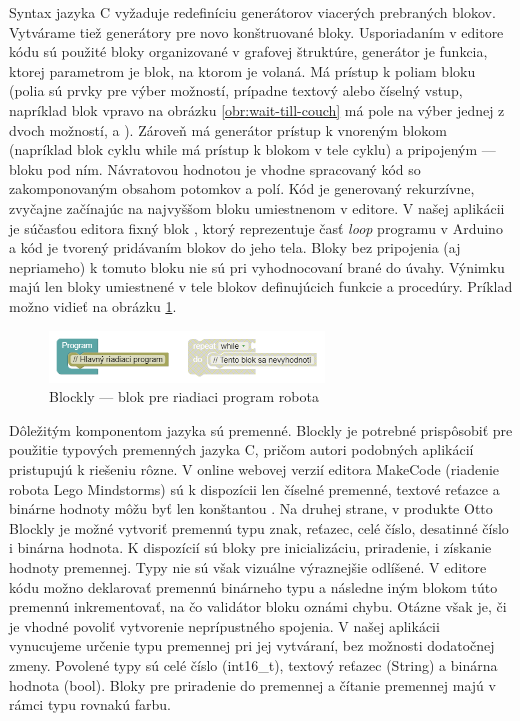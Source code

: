 Syntax jazyka C vyžaduje redefiníciu generátorov viacerých prebraných blokov. Vytvárame tiež generátory pre novo konštruované bloky. Usporiadaním v editore kódu sú použité bloky organizované v grafovej štruktúre, generátor je funkcia, ktorej parametrom je blok, na ktorom je volaná. Má prístup k poliam bloku (polia sú prvky pre výber možností, prípadne textový alebo číselný vstup, napríklad blok vpravo na obrázku \ref{obr:wait-till-couch} má pole na výber jednej z dvoch možností,  a ). Zároveň má generátor prístup k vnoreným blokom (napríklad blok cyklu while má prístup k blokom v tele cyklu) a pripojeným  --- bloku pod ním. Návratovou hodnotou je vhodne spracovaný kód so zakomponovaným obsahom potomkov a polí. Kód je generovaný rekurzívne, zvyčajne začínajúc na najvyššom bloku umiestnenom v editore. V našej aplikácii je súčasťou editora fixný blok , ktorý reprezentuje časť \textit{loop} programu v Arduino a kód je tvorený pridávaním blokov do jeho tela. Bloky bez pripojenia (aj nepriameho) k tomuto bloku nie sú pri vyhodnocovaní brané do úvahy. Výnimku majú len bloky umiestnené v tele blokov definujúcich funkcie a procedúry. Príklad možno vidieť na obrázku \ref{obr:disabled-orphan-block}.

\begin{figure}
\centerline{\includegraphics[width=0.65\textwidth]{images/disabled-orphan-block}}
\caption[Blockly --- blok pre riadiaci program robota]{Blockly --- blok pre riadiaci program robota}
\label{obr:disabled-orphan-block}
\end{figure}

Dôležitým komponentom jazyka sú premenné. Blockly je potrebné prispôsobiť pre použitie typových premenných jazyka C, pričom autori podobných aplikácií pristupujú k riešeniu rôzne. V online webovej verzií editora MakeCode (riadenie robota Lego Mindstorms) sú k dispozícii len číselné premenné, textové reťazce a binárne hodnoty môžu byť len konštantou \cite{makeCodeWebEditor}. Na druhej strane, v produkte Otto Blockly je možné vytvoriť premennú typu znak, reťazec, celé číslo, desatinné číslo i binárna hodnota. K dispozícií sú bloky pre inicializáciu, priradenie, i získanie hodnoty premennej. Typy nie sú však vizuálne výraznejšie odlíšené. V editore kódu možno deklarovať premennú binárneho typu a následne iným blokom túto premennú inkrementovať, na čo validátor bloku oznámi chybu. Otázne však je, či je vhodné povoliť vytvorenie neprípustného spojenia. V našej aplikácii vynucujeme určenie typu premennej pri jej vytváraní, bez možnosti dodatočnej zmeny. Povolené typy sú celé číslo (int16\_t), textový reťazec (String) a binárna hodnota (bool). Bloky pre priradenie do premennej a čítanie premennej majú v rámci typu rovnakú farbu.



